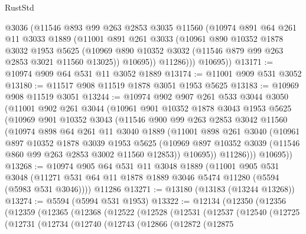 \begin{lexlean}{RustStd}
\begin{coremodule}
          @3036
          (@11546
            @893
            @99
            @263
            @2853
            @3035
            @11560
            (@10974
              @891
              @64
              @261
              @11
              @3033
              @1889
              (@11001
                @891
                @261
                @3033
                (@10961
                  @890
                  @10352
                  @1878
                  @3032
                  @1953
                  @5625
                  (@10969 @890 @10352 @3032 (@11546 @879 @99 @263 @2853 @3021 @11560 @13025))
                  @10695))
              @11286)))
        @10695))
@13171 := @10974 @909 @64 @531 @11 @3052 @1889
@13174 := @11001 @909 @531 @3052
@13180 := @11517 @908 @11519 @1878 @3051 @1953 @5625
@13183 := @10969 @908 @11519 @3051
@13244 := @10974
    @902
    @907
    @261
    @533
    @3044
    @3050
    (@11001
      @902
      @261
      @3044
      (@10961
        @901
        @10352
        @1878
        @3043
        @1953
        @5625
        (@10969
          @901
          @10352
          @3043
          (@11546
            @900
            @99
            @263
            @2853
            @3042
            @11560
            (@10974
              @898
              @64
              @261
              @11
              @3040
              @1889
              (@11001
                @898
                @261
                @3040
                (@10961
                  @897
                  @10352
                  @1878
                  @3039
                  @1953
                  @5625
                  (@10969 @897 @10352 @3039 (@11546 @860 @99 @263 @2853 @3002 @11560 @12853))
                  @10695))
              @11286)))
        @10695))
@13268 := @10974
    @905
    @64
    @531
    @11
    @3048
    @1889
    (@11001
      @905
      @531
      @3048
      (@11271 @531 @64 @11 @1878 @1889 @3046 @5474 @11280 (@5594 (@5983 @531 @3046))))
    @11286
@13271 := @13180 (@13183 (@13244 @13268))
@13274 := @5594 (@5994 @531 @1953)
@13322 := @12134
    (@12350
      (@12356
        (@12359
          (@12365
            (@12368
              (@12522
                (@12528
                  (@12531
                    (@12537
                      (@12540
                        (@12725
                          (@12731
                            (@12734
                              (@12740
                                (@12743
                                  (@12866
                                    (@12872
                                      (@12875

\end{coremodule}
\end{lexlean}
